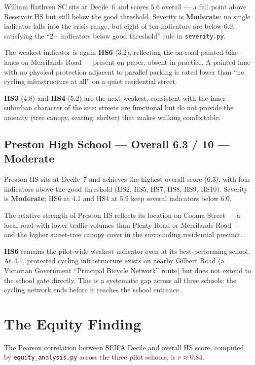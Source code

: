 \documentclass[11pt,a4paper,openany]{book}
\begin{document}
William Ruthven SC sits at Decile~6 and scores 5.6 overall --- a full point above
Reservoir HS but still below the good threshold.  Severity is \textbf{Moderate}: no
single indicator falls into the crisis range, but eight of ten indicators are below 6.0,
satisfying the ``2+ indicators below good threshold'' rule in \texttt{severity.py}.

The weakest indicator is again \textbf{HS6} (3.2), reflecting the on-road painted bike
lanes on Merrilands Road --- present on paper, absent in practice.  A painted lane with
no physical protection adjacent to parallel parking is rated lower than ``no cycling
infrastructure at all'' on a quiet residential street.

\textbf{HS3} (4.8) and \textbf{HS4} (5.2) are the next weakest, consistent with the
inner-suburban character of the site: streets are functional but do not provide the
amenity (tree canopy, seating, shelter) that makes walking comfortable.

\subsection{Preston High School --- Overall 6.3 / 10 --- Moderate}

Preston HS sits at Decile~7 and achieves the highest overall score (6.3), with four
indicators above the good threshold (HS2, HS5, HS7, HS8, HS9, HS10).  Severity is
\textbf{Moderate}: HS6 at 4.1 and HS4 at 5.9 keep several indicators below 6.0.

The relative strength of Preston HS reflects its location on Cooma Street --- a local
road with lower traffic volumes than Plenty Road or Merrilands Road --- and the
higher street-tree canopy cover in the surrounding residential precinct.

\textbf{HS6} remains the pilot-wide weakest indicator even at its best-performing school.
At 4.1, protected cycling infrastructure exists on nearby Gilbert Road (a Victorian
Government ``Principal Bicycle Network'' route) but does not extend to the school gate
directly.  This is a systematic gap across all three schools: the cycling network ends
before it reaches the school entrance.

\section{The Equity Finding}

The Pearson correlation between SEIFA Decile and overall HS score, computed by
\texttt{equity\_analysis.py} across the three pilot schools, is $r \approx 0.84$.
\end{document}

